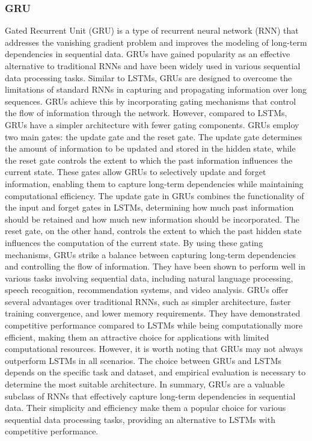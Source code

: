 \subsubsection{GRU}
Gated Recurrent Unit (GRU) is a type of recurrent neural network (RNN) that addresses the vanishing gradient problem and improves the modeling of long-term dependencies in sequential data. GRUs have gained popularity as an effective alternative to traditional RNNs and have been widely used in various sequential data processing tasks.
Similar to LSTMs, GRUs are designed to overcome the limitations of standard RNNs in capturing and propagating information over long sequences. GRUs achieve this by incorporating gating mechanisms that control the flow of information through the network. However, compared to LSTMs, GRUs have a simpler architecture with fewer gating components.
GRUs employ two main gates: the update gate and the reset gate. The update gate determines the amount of information to be updated and stored in the hidden state, while the reset gate controls the extent to which the past information influences the current state. These gates allow GRUs to selectively update and forget information, enabling them to capture long-term dependencies while maintaining computational efficiency.
The update gate in GRUs combines the functionality of the input and forget gates in LSTMs, determining how much past information should be retained and how much new information should be incorporated. The reset gate, on the other hand, controls the extent to which the past hidden state influences the computation of the current state.
By using these gating mechanisms, GRUs strike a balance between capturing long-term dependencies and controlling the flow of information. They have been shown to perform well in various tasks involving sequential data, including natural language processing, speech recognition, recommendation systems, and video analysis.
GRUs offer several advantages over traditional RNNs, such as simpler architecture, faster training convergence, and lower memory requirements. They have demonstrated competitive performance compared to LSTMs while being computationally more efficient, making them an attractive choice for applications with limited computational resources.
However, it is worth noting that GRUs may not always outperform LSTMs in all scenarios. The choice between GRUs and LSTMs depends on the specific task and dataset, and empirical evaluation is necessary to determine the most suitable architecture.
In summary, GRUs are a valuable subclass of RNNs that effectively capture long-term dependencies in sequential data. Their simplicity and efficiency make them a popular choice for various sequential data processing tasks, providing an alternative to LSTMs with competitive performance.
